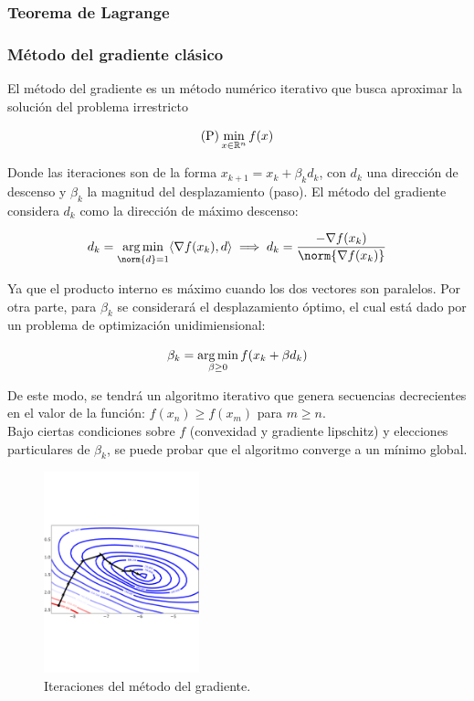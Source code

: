 \subsubsection{Teorema de Lagrange}


\subsubsection{Método del gradiente clásico}

El método del gradiente es un método numérico iterativo que busca aproximar la solución del problema irrestricto

\begin{equation*}
	\text{(P)} \min_{x\in {\mathbb R}^n} f(x)
\end{equation*}

Donde las iteraciones son de la forma $x_{k+1} = x_k + \beta_k d_k$, con $d_k$ una dirección de descenso y $\beta_k$ la magnitud del desplazamiento (paso). El método del gradiente considera $d_k$ como la dirección de máximo descenso:

\begin{equation*}
	d_k = \argmin_{\norm{d} = 1} \langle\nabla f(x_k),d\rangle \implies d_k = \frac{-\nabla f(x_k)}{\norm{\nabla f(x_k)}}
\end{equation*}

Ya que el producto interno es máximo cuando los dos vectores son paralelos. Por otra parte, para $\beta_k$ se considerará el desplazamiento óptimo, el cual está dado por un problema de optimización unidimiensional:

\begin{equation*}
	\beta_k = \operatorname*{arg\,min}_{\beta\geq 0} f(x_k + \beta d_k) 
\end{equation*}

De este modo, se tendrá un algoritmo iterativo que genera secuencias decrecientes en el valor de la función: $f(x_n)\geq f(x_m)$ para $m\geq n$.\\

Bajo ciertas condiciones sobre $f$ (convexidad y gradiente lipschitz) y elecciones particulares de $\beta_k$, se puede probar que el algoritmo converge a un mínimo global. 

\begin{figure}[H]
  \centering
  \includegraphics[width=0.4\textwidth]{img/anexos_gd}
  \caption{Iteraciones del método del gradiente.}
\end{figure}

